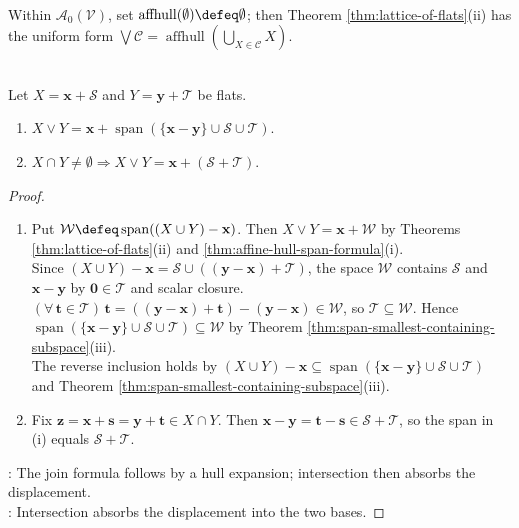 \begin{convention} \label{conv:empty-affine-hull-lattice} \\
Within $\mathcal{A}_0(\mathcal{V})$, set $\operatorname{affhull}(\emptyset)\defeq\emptyset$; then Theorem \ref{thm:lattice-of-flats}(ii) has the uniform form $\bigvee\mathcal{C}=\operatorname{affhull}(\bigcup\limits_{X\in\mathcal{C}}X)$.
\end{convention}

\begin{corollary} \label{cor:join-of-two-flats-formula} \\
Let $X=\mathbf{x}+\mathcal{S}$ and $Y=\mathbf{y}+\mathcal{T}$ be flats.
\begin{enumerate}[label=(\roman*)]
\setlength{\itemsep}{0pt}
\item $X\vee Y=\mathbf{x}+\operatorname{span}(\{\mathbf{x}-\mathbf{y}\}\cup\mathcal{S}\cup\mathcal{T})$.
\item $X\cap Y\neq\emptyset\Rightarrow X\vee Y=\mathbf{x}+(\mathcal{S}+\mathcal{T})$.
\end{enumerate}
\begin{proof}
\begin{enumerate}[label=(\roman*)]
\setlength{\itemsep}{0pt}
\item Put $\mathcal{W}\defeq\operatorname{span}((X\cup Y)-\mathbf{x})$. Then $X\vee Y=\mathbf{x}+\mathcal{W}$ by Theorems \ref{thm:lattice-of-flats}(ii) and \ref{thm:affine-hull-span-formula}(i).\\
Since $(X\cup Y)-\mathbf{x}=\mathcal{S}\cup((\mathbf{y}-\mathbf{x})+\mathcal{T})$, the space $\mathcal{W}$ contains $\mathcal{S}$ and $\mathbf{x}-\mathbf{y}$ by $\mathbf{0}\in\mathcal{T}$ and scalar closure.\\
$(\forall\,\mathbf{t}\in\mathcal{T})\,\mathbf{t}=((\mathbf{y}-\mathbf{x})+\mathbf{t})-(\mathbf{y}-\mathbf{x})\in\mathcal{W}$, so $\mathcal{T}\subseteq\mathcal{W}$. Hence $\operatorname{span}(\{\mathbf{x}-\mathbf{y}\}\cup\mathcal{S}\cup\mathcal{T})\subseteq\mathcal{W}$ by Theorem \ref{thm:span-smallest-containing-subspace}(iii).\\
The reverse inclusion holds by $(X\cup Y)-\mathbf{x}\subseteq\operatorname{span}(\{\mathbf{x}-\mathbf{y}\}\cup\mathcal{S}\cup\mathcal{T})$ and Theorem \ref{thm:span-smallest-containing-subspace}(iii).
\item Fix $\mathbf{z}=\mathbf{x}+\mathbf{s}=\mathbf{y}+\mathbf{t}\in X\cap Y$. Then $\mathbf{x}-\mathbf{y}=\mathbf{t}-\mathbf{s}\in\mathcal{S}+\mathcal{T}$, so the span in (i) equals $\mathcal{S}+\mathcal{T}$.
\end{enumerate}
: The join formula follows by a hull expansion; intersection then absorbs the displacement.\\
: Intersection absorbs the displacement into the two bases.
\end{proof}
\end{corollary}

